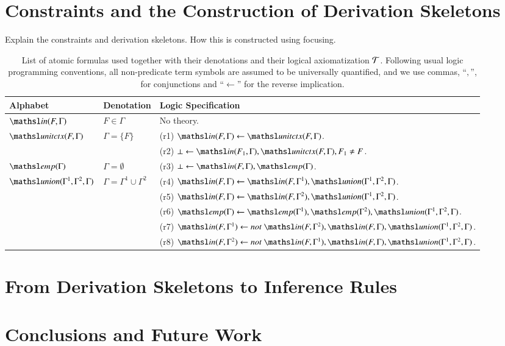 \documentclass[a4paper,10pt]{article}
\newcommand\thSeq{\ensuremath{\Tscr}}
\newcommand{\elin}[2]{\ensuremath{{\tsl{unitctx}(\ensuremath{#1}, \ensuremath{#2})}}}
\newcommand{\emp}[1]{\ensuremath{{\tsl{emp}(\ensuremath{#1})}}}
\newcommand{\union}[3]{\ensuremath{{\tsl{union}(\ensuremath{#1},\ensuremath{#2},\ensuremath{ #3})}}}
\newcommand{\In}[2]{\ensuremath{\tsl{in}(\ensuremath{#1},\ensuremath{#2})}}
\newcommand\dnot{\ensuremath{\mathit{not}}\xspace}
\begin{document}

\section{Constraints and the Construction of Derivation Skeletons}

Explain the constraints and derivation skeletons. How this is constructed using focusing.

\begin{table}[t]
\caption{\small List of atomic formulas used together
with their denotations and their logical axiomatization $\thSeq$. Following 
usual logic programming conventions, all non-predicate term symbols are assumed 
to be universally quantified, and we use commas, ``$,$'', for conjunctions and
 ``$\leftarrow$'' for the reverse implication.}
\label{fig:predicates}
\begin{tabular}{l@{\quad}p{2cm}@{\quad}l}
\toprule
Alphabet & Denotation & Logic Specification \\[1pt]
\midrule
$\In{F}{\Gamma}$ & $F \in \Gamma$ & No theory.\\
\midrule
$\elin{F}{\Gamma}$ &  $\Gamma = \{F\}$ & (r1) $\In{F}{\Gamma} \leftarrow \elin{F}{\Gamma}$. \\[1pt]
&& (r2) $\bot \leftarrow \In{F_1}{\Gamma}, \elin{F}{\Gamma}, F_1 \neq F$. \\
\midrule
$\emp{\Gamma}$ & $\Gamma = \emptyset$ 
&  (r3) $\bot \leftarrow \In{F}{\Gamma}, \emp{\Gamma}$. \\
\midrule
$\union{\Gamma^1} {\Gamma^2} {\Gamma}$ & $\Gamma = \Gamma^1 \cup \Gamma^2$ & 
   (r4) $\In{F}{\Gamma} \leftarrow \In{F}{\Gamma^1}, \union{\Gamma^1}{\Gamma^2}{\Gamma}$. \\[1pt]
&& (r5) $\In{F}{\Gamma} \leftarrow \In{F}{\Gamma^2}, \union{\Gamma^1}{\Gamma^2}{\Gamma}$. \\[1pt]
&& (r6) $\emp{\Gamma}  \leftarrow \emp{\Gamma^1},\emp{\Gamma^2}, \union{\Gamma^1}{\Gamma^2}{\Gamma}$. \\[1pt]
&& (r7) $\In{F}{\Gamma^1}  \leftarrow \dnot\ \In{F}{\Gamma^2}, \In{F}{\Gamma}, \union{\Gamma^1}{\Gamma^2}{\Gamma}$. \\
&& (r8) $\In{F}{\Gamma^2}  \leftarrow \dnot\ \In{F}{\Gamma^1}, \In{F}{\Gamma}, \union{\Gamma^1}{\Gamma^2}{\Gamma}$. \\
\bottomrule
\end{tabular}
\vspace{-4mm}
\end{table}


\section{From Derivation Skeletons to Inference Rules}

\section{Conclusions and Future Work}



\end{document}
